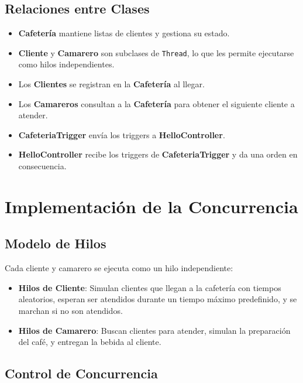 \documentclass[a4paper,12pt]{article}
\begin{document}
\subsection{Relaciones entre Clases}

\begin{itemize}
    \item \textbf{Cafetería} mantiene listas de clientes y gestiona su estado.
    \item \textbf{Cliente} y \textbf{Camarero} son subclases de \texttt{Thread}, lo que les permite ejecutarse como hilos independientes.
    \item Los \textbf{Clientes} se registran en la \textbf{Cafetería} al llegar.
    \item Los \textbf{Camareros} consultan a la \textbf{Cafetería} para obtener el siguiente cliente a atender.
    \item \textbf{CafeteriaTrigger} envía los triggers a \textbf{HelloController}.
    \item \textbf{HelloController} recibe los triggers de \textbf{CafeteriaTrigger} y da una orden en consecuencia.
\end{itemize}

\section{Implementación de la Concurrencia}

\subsection{Modelo de Hilos}

Cada cliente y camarero se ejecuta como un hilo independiente:

\begin{itemize}
    \item \textbf{Hilos de Cliente}: Simulan clientes que llegan a la cafetería con tiempos aleatorios, esperan ser atendidos durante un tiempo máximo predefinido, y se marchan si no son atendidos.
    \item \textbf{Hilos de Camarero}: Buscan clientes para atender, simulan la preparación del café, y entregan la bebida al cliente.
\end{itemize}

\subsection{Control de Concurrencia}
\end{document}
